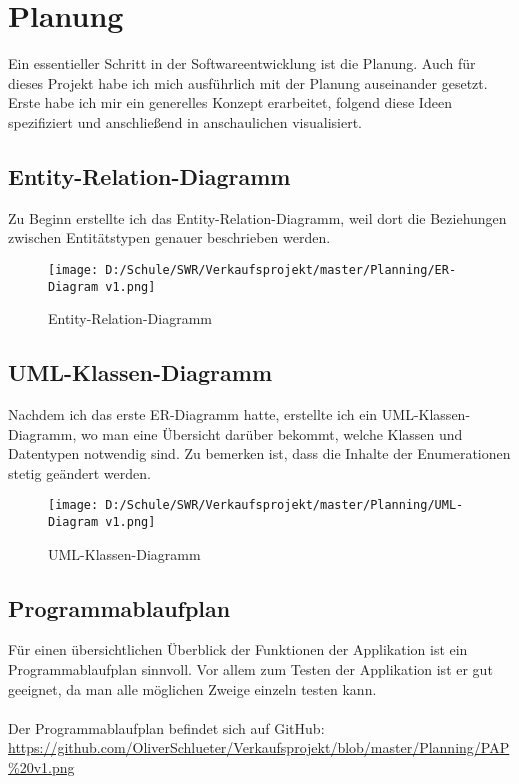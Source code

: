 \chapter{Planung}

Ein essentieller Schritt in der Softwareentwicklung ist die Planung. Auch für dieses Projekt habe ich mich ausführlich mit der Planung auseinander gesetzt. Erste habe ich mir ein generelles Konzept erarbeitet, folgend diese Ideen spezifiziert und anschließend in anschaulichen visualisiert.

\section{Entity-Relation-Diagramm}
Zu Beginn erstellte ich das Entity-Relation-Diagramm, weil dort die Beziehungen zwischen Entitätstypen genauer beschrieben werden. 

\begin{figure}[h]
\texttt{[image: D:/Schule/SWR/Verkaufsprojekt/master/Planning/ER-Diagram v1.png]}
\caption{Entity-Relation-Diagramm}
\end{figure}

\section{UML-Klassen-Diagramm}

Nachdem ich das erste ER-Diagramm hatte, erstellte ich ein UML-Klassen-Diagramm, wo man eine Übersicht darüber bekommt, welche Klassen und Datentypen notwendig sind. Zu bemerken ist, dass die Inhalte der Enumerationen stetig geändert werden.

\begin{figure}[h]
\texttt{[image: D:/Schule/SWR/Verkaufsprojekt/master/Planning/UML-Diagram v1.png]}
\caption{UML-Klassen-Diagramm}
\end{figure}

\section{Programmablaufplan}

Für einen übersichtlichen Überblick der Funktionen der Applikation ist ein Programmablaufplan sinnvoll. Vor allem zum Testen der Applikation ist er gut geeignet, da man alle möglichen Zweige einzeln testen kann.\\
\\Der Programmablaufplan befindet sich auf GitHub: \url{https://github.com/OliverSchlueter/Verkaufsprojekt/blob/master/Planning/PAP%20v1.png}

